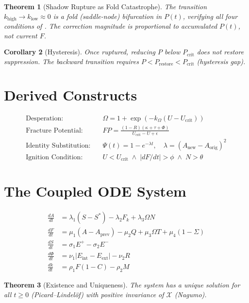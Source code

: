 \documentclass[12pt,a4paper,twoside]{article}
\theoremstyle{plain}
\newtheorem{theorem}{Theorem}[section]
\newtheorem{corollary}[theorem]{Corollary}
\theoremstyle{definition}
\theoremstyle{remark}
\newcommand{\X}{\mathcal{X}}
\newcommand{\Fk}{F_k}
\newcommand{\Ucrit}{U_{\mathrm{crit}}}
\newcommand{\Pcrit}{P_{\mathrm{crit}}}
\begin{document}
\begin{theorem}[Shadow Rupture as Fold Catastrophe]
The transition $k_{\mathrm{high}} \to k_{\mathrm{low}} \approx 0$ is a fold (saddle-node) bifurcation in $P(t)$, verifying all four conditions of \citet{kuznetsov2004}. The correction magnitude is proportional to accumulated $P(t)$, not current $F$.
\end{theorem}

\begin{corollary}[Hysteresis]
Once ruptured, reducing $P$ below $\Pcrit$ does not restore suppression. The backward transition requires $P < P_{\mathrm{restore}} < \Pcrit$ (hysteresis gap).
\end{corollary}


\section{Derived Constructs}

\begin{align}
\text{Desperation:} \quad & \Omega = 1 + \exp(-k_\Omega(U - \Ucrit)) \label{eq:omega}\\
\text{Fracture Potential:} \quad & FP = \frac{(1-R)(\kappa + \tau + \Phi)}{\Ucrit - U + \epsilon} \label{eq:FP}\\
\text{Identity Substitution:} \quad & \Psi(t) = 1 - e^{-\lambda t}, \quad \lambda = (A_{\mathrm{new}} - A_{\mathrm{orig}})^2 \label{eq:psi}\\
\text{Ignition Condition:} \quad & U < \Ucrit \;\wedge\; |dF/dt| > \phi \;\wedge\; N > \theta \label{eq:ignition}
\end{align}


\section{The Coupled ODE System}

\begin{align}
\frac{dA}{dt} &= \lambda_1(S - S^*) - \lambda_2 \Fk + \lambda_3 \Omega N \\
\frac{dF}{dt} &= \mu_1(A - A_{\mathrm{prev}}) - \mu_2 Q + \mu_3 \Omega T + \mu_4(1-\Sigma) \\
\frac{dS}{dt} &= \sigma_1 E^+ - \sigma_2 E^- \\
\frac{d\Phi}{dt} &= \nu_1 |E_{\mathrm{int}} - E_{\mathrm{ext}}| - \nu_2 R \\
\frac{dk}{dt} &= \rho_1 F(1-C) - \rho_2 M
\end{align}

\begin{theorem}[Existence and Uniqueness]
The system has a unique solution for all $t \geq 0$ (Picard--Lindel\"of) with positive invariance of $\X$ (Nagumo).
\end{theorem}
\end{document}
